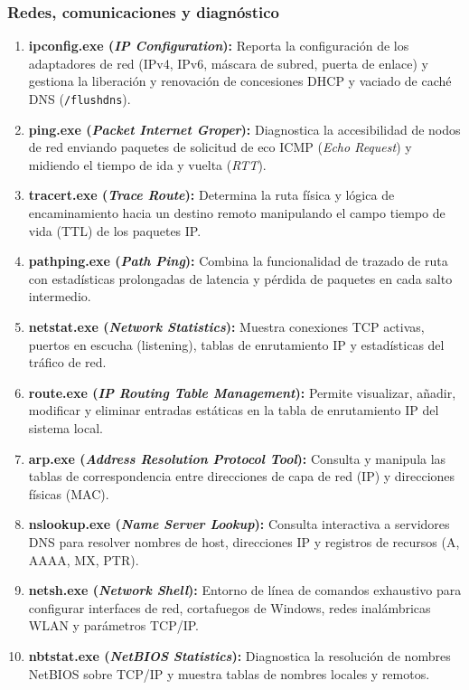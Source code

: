 \documentclass[12pt]{article}
\begin{document}
\subsubsection{Redes, comunicaciones y diagnóstico}
\begin{enumerate}[leftmargin=*, noitemsep, topsep=1pt]
    \item \textbf{ipconfig.exe (\textit{IP Configuration}):} Reporta la configuración de los adaptadores de red (IPv4, IPv6, máscara de subred, puerta de enlace) y gestiona la liberación y renovación de concesiones DHCP y vaciado de caché DNS (\texttt{/flushdns}).
    \item \textbf{ping.exe (\textit{Packet Internet Groper}):} Diagnostica la accesibilidad de nodos de red enviando paquetes de solicitud de eco ICMP (\textit{Echo Request}) y midiendo el tiempo de ida y vuelta (\textit{RTT}).
    \item \textbf{tracert.exe (\textit{Trace Route}):} Determina la ruta física y lógica de encaminamiento hacia un destino remoto manipulando el campo tiempo de vida (TTL) de los paquetes IP.
    \item \textbf{pathping.exe (\textit{Path Ping}):} Combina la funcionalidad de trazado de ruta con estadísticas prolongadas de latencia y pérdida de paquetes en cada salto intermedio.
    \item \textbf{netstat.exe (\textit{Network Statistics}):} Muestra conexiones TCP activas, puertos en escucha (listening), tablas de enrutamiento IP y estadísticas del tráfico de red.
    \item \textbf{route.exe (\textit{IP Routing Table Management}):} Permite visualizar, añadir, modificar y eliminar entradas estáticas en la tabla de enrutamiento IP del sistema local.
    \item \textbf{arp.exe (\textit{Address Resolution Protocol Tool}):} Consulta y manipula las tablas de correspondencia entre direcciones de capa de red (IP) y direcciones físicas (MAC).
    \item \textbf{nslookup.exe (\textit{Name Server Lookup}):} Consulta interactiva a servidores DNS para resolver nombres de host, direcciones IP y registros de recursos (A, AAAA, MX, PTR).
    \item \textbf{netsh.exe (\textit{Network Shell}):} Entorno de línea de comandos exhaustivo para configurar interfaces de red, cortafuegos de Windows, redes inalámbricas WLAN y parámetros TCP/IP.
    \item \textbf{nbtstat.exe (\textit{NetBIOS Statistics}):} Diagnostica la resolución de nombres NetBIOS sobre TCP/IP y muestra tablas de nombres locales y remotos.

\end{enumerate}
\end{document}
